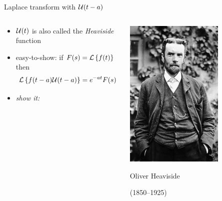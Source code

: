 \documentclass[urlcolor=blue,dvipsnames]{beamer}
\begin{document}
\begin{frame}{Laplace transform with $\mathcal{U}(t-a)$}

\begin{columns}
\begin{column}{0.8\textwidth}
\begin{itemize}
\item $\mathcal{U}(t)$ is also called the \emph{Heaviside} function
\item easy-to-show: if $F(s)=\mathcal{L}\left\{f(t)\right\}$ then
    $$\mathcal{L}\left\{f(t-a)\mathcal{U}(t-a)\right\} = e^{-at} F(s)$$

\item \emph{show it:}

\vspace{40mm}
\end{itemize}
\end{column}
\begin{column}{0.2\textwidth}
\vspace{3mm}

\includegraphics[width=0.7\textwidth]{figs/Heaviside}

\tiny
Oliver Heaviside

(1850--1925)


\end{column}
\end{columns}
\end{frame}
\end{document}
